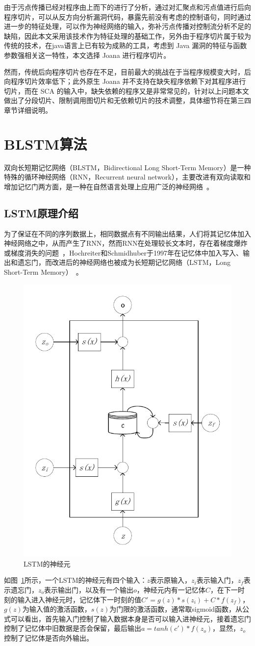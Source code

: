 由于污点传播已经对程序由上而下的进行了分析，通过对汇聚点和污点值进行后向程序切片，可以从反方向分析漏洞代码，暴露先前没有考虑的控制语句，同时通过进一步的特征处理，可以作为神经网络的输入，弥补污点传播对控制流分析不足的缺陷，因此本文采用该技术作为特征处理的基础工作，另外由于程序切片属于较为传统的技术，在java语言上已有较为成熟的工具，考虑到 Java 漏洞的特征与函数参数强相关这一特性，本文选择 Joana 进行程序切片。

然而，传统后向程序切片也存在不足，目前最大的挑战在于当程序规模变大时，后向程序切片效率低下；此外原生 Joana 并不支持在缺失程序依赖下对其程序进行切片，而在 SCA 的输入中，缺失依赖的程序又是非常常见的，针对以上问题本文做出了分段切片、限制调用图切片和无依赖切片的技术调整，具体细节将在第三四章节详细说明。\\

\section{BLSTM算法}
双向长短期记忆网络（BLSTM，Bidirectional Long Short-Term Memory）是一种特殊的循环神经网络（RNN，Recurrent neural network），主要改进有双向读取和增加记忆门两方面，是一种在自然语言处理上应用广泛的神经网络~\cite{lstm:translate}。\\

\subsection{LSTM原理介绍}
为了保证在不同的序列数据上，相同数据点有不同输出结果，人们将其记忆体加入神经网络之中，从而产生了RNN，然而RNN在处理较长文本时，存在着梯度爆炸或梯度消失的问题~\cite{lstm:gradient}，Hochreiter和Schmidhuber于1997年在记忆体中加入写入、输出和遗忘门，而改进后的神经网络也被成为长短期记忆网络（LSTM，Long Short-Term Memory）~\cite{lstm:1997}。

\begin{figure}[htb]
	\centering
	\includegraphics[width=0.4\linewidth]{FIGs/chapter2/lstm_cell.pdf}
	\caption{LSTM的神经元}\label{lstmcell}
\end{figure}
如图~\ref{lstmcell}所示，一个LSTM的神经元有四个输入：$z$表示原输入，$z_i$表示输入门，$z_f$表示遗忘门，$z_o$表示输出门，以及有一个输出$o$，神经元内有一记忆体$C$，在下一时刻的输入进入神经元时，记忆体下一时刻的值$C'=g(z)*s(z_i)+C*f(z_f)$，$g(z)$为输入值的激活函数，$s(z)$为门限的激活函数，通常取sigmoid函数，从公式可以看出，首先输入门控制了输入数据本身是否可以输入进神经元，接着遗忘门控制了记忆体中旧数据是否会保留，最后输出$a=tanh(c')*f(z_o)$，显然，$z_o$控制了记忆体是否向外输出。

